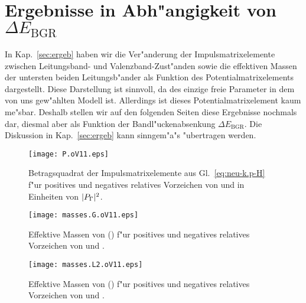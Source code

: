 
\chapter{Ergebnisse in Abh"angigkeit von $\Delta E_{\mathrm{BGR}}$}
\label{cha:ergeb-BGR}

In Kap.~\ref{sec:ergeb} haben wir die Ver"anderung der Impulsmatrixelemente
zwischen Leitungsband- und Valenzband-Zust"anden sowie die effektiven Massen
der untersten beiden Leitungsb"ander als Funktion des Potentialmatrixelements
 dargestellt. Diese Darstellung ist sinnvoll, da  des einzige
freie Parameter in dem von uns gew"ahlten Modell ist. Allerdings ist dieses
Potentialmatrixelement kaum me"sbar. Deshalb stellen wir auf den folgenden
Seiten diese Ergebnisse nochmals dar, diesmal aber als Funktion der
Bandl"uckenabsenkung $\Delta E_{\mathrm{BGR}}$. Die Diskussion in
Kap.~\ref{sec:ergeb} kann sinngem"a"s "ubertragen werden.

\begin{figure}[htb]
  \centering 
  \texttt{[image: P.oV11.eps]}
  \caption{Betragsquadrat der Impulsmatrixelemente aus
  Gl.~\eqref{eq:neu-k.p-H} f"ur positives und negatives relatives Vorzeichen
  von  und  in Einheiten von $|P_{\Gamma}|^{2}$.} 
  \label{fig:P-me.oV11}
\end{figure}


\begin{figure}[htb]
  \centering
  \texttt{[image: masses.G.oV11.eps]}
  \caption{Effektive Massen von \bGCB (\GCB) f"ur positives und negatives
    relatives Vorzeichen von  und .} 
  \label{fig:m*-GCB.oV11}
\end{figure}


\begin{figure}[htb]
  \centering
  \texttt{[image: masses.L2.oV11.eps]}
  \caption{Effektive Massen von \bGCB (\LCB) f"ur positives und negatives
    relatives Vorzeichen von  und .} 
  \label{fig:m*-LCB.oV11}
\end{figure}



